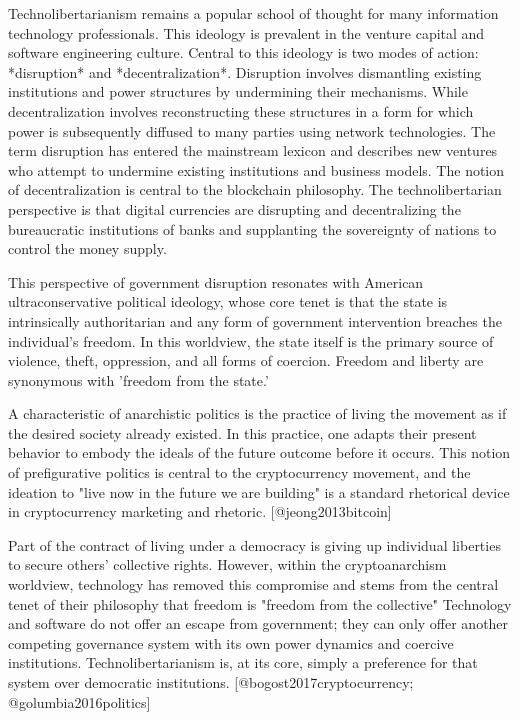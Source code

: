 Technolibertarianism remains a popular school of thought for many information
technology professionals. This ideology is prevalent in the venture capital and
software engineering culture. Central to this ideology is two modes of action:
*disruption* and *decentralization*. Disruption involves dismantling existing
institutions and power structures by undermining their mechanisms. While
decentralization involves reconstructing these structures in a form for which
power is subsequently diffused to many parties using network technologies. The
term disruption has entered the mainstream lexicon and describes new ventures
who attempt to undermine existing institutions and business models. The notion
of decentralization is central to the blockchain philosophy. The
technolibertarian perspective is that digital currencies are disrupting and
decentralizing the bureaucratic institutions of banks and supplanting the
sovereignty of nations to control the money supply.


This perspective of government disruption resonates with American
ultraconservative political ideology, whose core tenet is that the state is
intrinsically authoritarian and any form of government intervention breaches the
individual's freedom. In this worldview, the state itself is the primary source
of violence, theft, oppression, and all forms of coercion. Freedom and liberty
are synonymous with 'freedom from the state.'

A characteristic of anarchistic politics is the practice of living the movement
as if the desired society already existed. In this practice, one adapts their
present behavior to embody the ideals of the future outcome before it occurs.
This notion of prefigurative politics is central to the cryptocurrency movement,
and the ideation to "live now in the future we are building" is a standard
rhetorical device in cryptocurrency marketing and rhetoric. [@jeong2013bitcoin]
\cite{jeong2013bitcoin}


Part of the contract of living under a democracy is giving up individual
liberties to secure others' collective rights. However, within the
cryptoanarchism worldview, technology has removed this compromise and stems from
the central tenet of their philosophy that freedom is "freedom from the
collective\." Technology and software do not offer an escape from government;
they can only offer another competing governance system with its own power
dynamics and coercive institutions. Technolibertarianism is, at its core, simply
a preference for that system over democratic institutions.
[@bogost2017cryptocurrency; @golumbia2016politics]
\cite{bogost2017cryptocurrency, golumbia2016politics}

